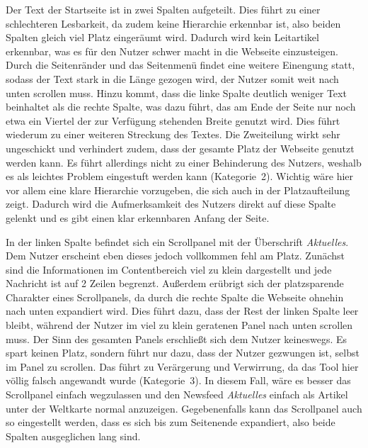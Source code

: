 {Der Text der Startseite ist in zwei Spalten aufgeteilt. Dies führt zu einer schlechteren Lesbarkeit, da zudem keine Hierarchie erkennbar ist, also beiden Spalten gleich viel Platz eingeräumt wird.
Dadurch wird kein Leitartikel erkennbar, was es für den Nutzer schwer macht in die Webseite einzusteigen. 
Durch die Seitenränder und das Seitenmenü findet eine weitere Einengung statt, sodass der Text stark in die Länge gezogen wird, der Nutzer somit weit nach unten scrollen muss.
Hinzu kommt, dass die linke Spalte deutlich weniger Text beinhaltet als die rechte Spalte, was dazu führt, das am Ende der Seite nur noch etwa ein Viertel der zur Verfügung stehenden Breite genutzt wird. Dies führt wiederum zu einer weiteren Streckung des Textes. 
}{Die Zweiteilung wirkt sehr ungeschickt und verhindert zudem, dass der gesamte Platz der Webseite genutzt werden kann. Es führt allerdings nicht zu einer Behinderung des Nutzers, weshalb es als leichtes Problem eingestuft werden kann (Kategorie~2).
}{Wichtig wäre hier vor allem eine klare Hierarchie vorzugeben, die sich auch in der Platzaufteilung zeigt. Dadurch wird die Aufmerksamkeit des Nutzers direkt auf diese Spalte gelenkt und es gibt einen klar erkennbaren Anfang der Seite.}\label{prob:start:design}

{In der linken Spalte befindet sich ein Scrollpanel mit der Überschrift \emph{Aktuelles}. Dem Nutzer erscheint eben dieses jedoch vollkommen fehl am Platz.
Zunächst sind die Informationen im Contentbereich viel zu klein dargestellt und jede Nachricht ist auf 2 Zeilen begrenzt. Außerdem erübrigt sich der platzsparende Charakter eines Scrollpanels, da durch die rechte Spalte die Webseite ohnehin nach unten expandiert wird. 
Dies führt dazu, dass der Rest der linken Spalte leer bleibt, während der Nutzer im viel zu klein geratenen Panel nach unten scrollen muss.
}{
Der Sinn des gesamten Panels erschließt sich dem Nutzer keineswegs. Es spart keinen Platz, sondern führt nur dazu, dass der Nutzer gezwungen ist, selbst im Panel zu scrollen. Das führt zu Verärgerung und Verwirrung, da das Tool hier völlig falsch angewandt wurde (Kategorie~3).
}{
In diesem Fall, wäre es besser das Scrollpanel einfach wegzulassen und den Newsfeed \emph{Aktuelles} einfach als Artikel unter der Weltkarte normal anzuzeigen. Gegebenenfalls kann das Scrollpanel auch so eingestellt werden, dass es sich bis zum Seitenende expandiert, also beide Spalten ausgeglichen lang sind. 
}\label{prob:start:panel}

